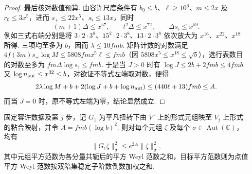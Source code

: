 \begin{proof}
最后核对数值预算. 由容许尺度条件有 $b_0\le b$、$\ell\ge10^6$、$m\le2x$ 及 $r_0\le3x^5$，进而 $s_+\le22x^5$、$s_\flat\le13x$，同时
\[
 (m+1)\Delta\le x^{57},\qquad
 t^2\Delta\le x^{72},\qquad
 \Delta s_\flat\le x^{59}.
\]
例如三式右端分别是将 $3\cdot2\cdot3^8$、$15^2\cdot2\cdot3^8$、$13\cdot2\cdot3^8$ 依次放大为 $x^{16}$、$x^{22}$、$x^{18}$ 所得. 三项均至多为 $b$，因而 $\lambda\le10fmb$. 矩阵计数的对数满足 $4f(3m)s_+\log M\le 5808fm x^5\ell\le fmb$（因 $5808x^5\le x^{18}\le\sqrt b$），选行表数目的对数至多为 $fm\Delta\log s_\flat\le fmb$. 于是当 $J>0$ 时有 $\log J\le2b+2fmb\le4fmb$. 又 $\log n_{\rm aut}\le x^{32}\le b$，对欲证不等式左端取对数，便得
\[
 2\lambda\log M+b+2(\log J+b+\log n_{\rm aut})
 \le (440\ell+13)fmb
 \le A .
\]
而当 $J=0$ 时，原不等式左端为零，结论显然成立.
\end{proof}

\begin{lemma}[平凡扭转下粘合映射的范数]
\label{lem:c-gluing-norm}
\emitthmsource
固定容许数据及第 $j$ 步，记 $G_1$ 为平凡扭转下由 $V^\circ$ 上的形式元组映至 $V_j$ 上形式的粘合映射，并令 $A=fmb(\log b)^2$. 则对每个元组 $\zeta$ 及每个 $\sigma\in\operatorname{Aut}(\mathbb C)$，均有
\[
  \|G_1\zeta\|_\sigma^2\le e^{2A}\|\zeta\|_\sigma^2,
\]
其中元组平方范数为各分量共轭后的平方 Weyl 范数之和，目标平方范数则为点值平方 Weyl 范数按双陪集稳定子阶数倒数加权之和.
\end{lemma}

